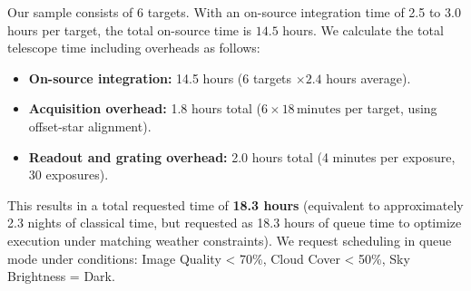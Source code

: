 Our sample consists of 6 targets. With an on-source integration time of 2.5 to 3.0 hours per target, the total on-source time is $14.5$ hours. We calculate the total telescope time including overheads as follows:
\begin{itemize}
    \item \textbf{On-source integration:} 14.5 hours (6 targets $\times 2.4$ hours average).
    \item \textbf{Acquisition overhead:} 1.8 hours total ($6 \times 18\,\text{minutes}$ per target, using offset-star alignment).
    \item \textbf{Readout and grating overhead:} 2.0 hours total (4 minutes per exposure, 30 exposures).
\end{itemize}
This results in a total requested time of \textbf{18.3 hours} (equivalent to approximately 2.3 nights of classical time, but requested as 18.3 hours of queue time to optimize execution under matching weather constraints). We request scheduling in queue mode under conditions: Image Quality < 70\%, Cloud Cover < 50\%, Sky Brightness = Dark.
